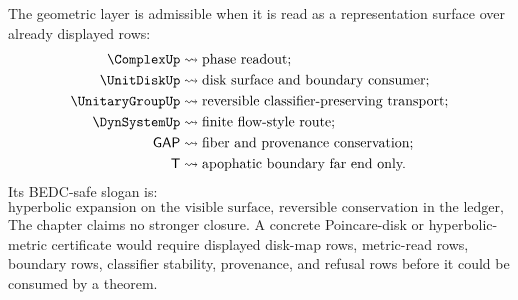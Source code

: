 The geometric layer is admissible when it is read as a representation surface over already displayed rows:
$$
\begin{aligned}
\ComplexUp &\leadsto \text{phase readout;}\\
\UnitDiskUp &\leadsto \text{disk surface and boundary consumer;}\\
\UnitaryGroupUp &\leadsto \text{reversible classifier-preserving transport;}\\
\DynSystemUp &\leadsto \text{finite flow-style route;}\\
\mathsf{GAP} &\leadsto \text{fiber and provenance conservation;}\\
\mathsf{T} &\leadsto \text{apophatic boundary far end only.}
\end{aligned}
$$
Its BEDC-safe slogan is:
$$
\text{hyperbolic expansion on the visible surface, reversible conservation in the ledger, apophatic fixedness at the fiber far end.}
$$
The chapter claims no stronger closure. A concrete Poincare-disk or hyperbolic-metric certificate would require displayed disk-map rows, metric-read rows, boundary rows, classifier stability, provenance, and refusal rows before it could be consumed by a theorem.

